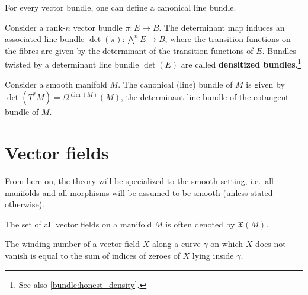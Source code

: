     For every vector bundle, one can define a canonical line bundle.
    \begin{construct}
        Consider a rank-$n$ vector bundle $\pi:E\rightarrow B$. The determinant map induces an associated line bundle $\det(\pi):\bigwedge^nE\rightarrow B$, where the transition functions on the fibres are given by the determinant of the transition functions of $E$. Bundles twisted by a determinant line bundle $\det(E)$ are called \textbf{densitized bundles}.\footnote{See also \cref{bundle:honest_density}.}
    \end{construct}
    \begin{example}\label{bundle:canonical_bundle}
        Consider a smooth manifold $M$. The canonical (line) bundle of $M$ is given by $\det(T^*M)=\Omega^{\dim(M)}(M)$, the determinant line bundle of the cotangent bundle of $M$.
    \end{example}

\section{Vector fields}

    From here on, the theory will be specialized to the smooth setting, i.e.~all manifolds and all morphisms will be assumed to be smooth (unless stated otherwise).

    \begin{notation}
        The set of all vector fields on a manifold $M$ is often denoted by $\mathfrak{X}(M)$.
    \end{notation}

    \begin{property}
        The winding number of a vector field $X$ along a curve $\gamma$ on which $X$ does not vanish is equal to the sum of indices of zeroes of $X$ lying inside $\gamma$.
    \end{property}

